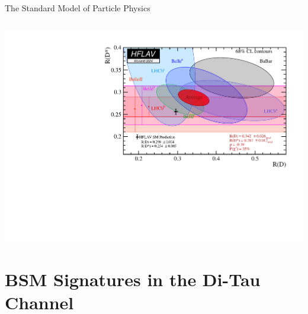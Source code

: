 \documentclass{../bredelebeamer}
\begin{document}
\begin{frame}{The Standard Model of Particle Physics}
\begin{minipage}[t]{0.53\linewidth}
        $$ $$

        \includegraphics[width=1.05\linewidth]{../2023_paper/RDRDst_hflav.pdf}    
    
    \end{minipage}
\end{frame}

\section{BSM Signatures in the Di-Tau Channel}
\end{document}
